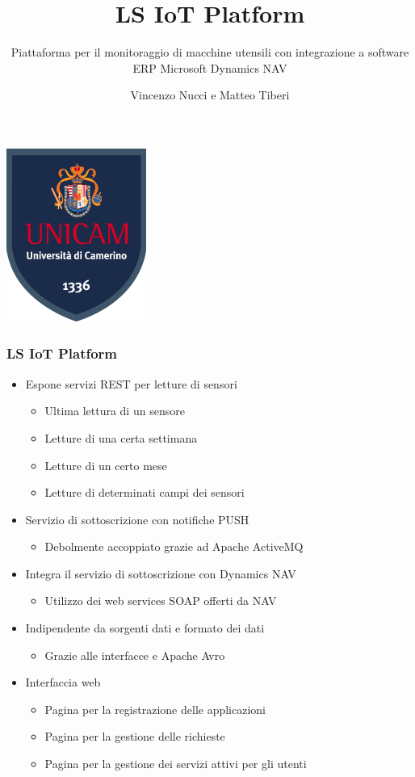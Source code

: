 \documentclass{beamer}
\title{LS IoT Platform}
\subtitle{Piattaforma per il monitoraggio di macchine utensili con integrazione a software ERP Microsoft Dynamics NAV}
\author{Vincenzo Nucci e Matteo Tiberi}
\institute{Università di Camerino}
\date{}
\begin{document}
	
	\begin{frame}
	\centering
	\includegraphics[scale=0.7]{images/stemma.png}\par
\end{frame}


\begin{frame}
\frametitle{LS IoT Platform}
\begin{itemize}
	\item Espone servizi REST per letture di sensori
	\begin{itemize}
		\item Ultima lettura di un sensore
		\item Letture di una certa settimana
		\item Letture di un certo mese
		\item Letture di determinati campi dei sensori
	\end{itemize}
	\item Servizio di sottoscrizione con notifiche PUSH
	\begin{itemize}
		\item Debolmente accoppiato grazie ad Apache ActiveMQ
	\end{itemize}
	\item Integra il servizio di sottoscrizione con Dynamics NAV
	\begin{itemize}
		\item Utilizzo dei web services SOAP offerti da NAV
	\end{itemize}
	\item Indipendente da sorgenti dati e formato dei dati
	\begin{itemize}
		\item Grazie alle interfacce e Apache Avro
	\end{itemize}
	\item Interfaccia web
	\begin{itemize}
		\item Pagina per la registrazione delle applicazioni
		\item Pagina per la gestione delle richieste
		\item Pagina per la gestione dei servizi attivi per gli utenti
	\end{itemize}
\end{itemize}
\end{frame}
\end{document}
